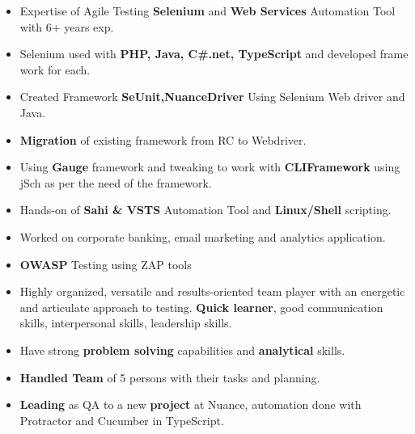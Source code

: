 

\begin{cvparagraph}

\begin{itemize}
 \item {Expertise of Agile Testing \textbf{Selenium} and \textbf{Web Services} Automation Tool with 6+ years exp.}

 \item {Selenium used with \textbf{PHP, Java, C\#.net, TypeScript} and developed frame work for each.}

 \item {Created Framework \textbf{SeUnit,NuanceDriver} Using Selenium Web driver and Java.}

 \item {\textbf{Migration} of existing framework from RC to Webdriver.}

 \item {Using \textbf{Gauge} framework and tweaking to work with \textbf{CLIFramework} using jSch as per the need of the framework.}

 \item {Hands-on of \textbf{Sahi \& VSTS} Automation Tool and \textbf{Linux/Shell} scripting.}

 \item {Worked on corporate banking, email marketing and analytics application.}

 \item {\textbf{OWASP} Testing using ZAP tools}

 \item {Highly organized, versatile and results-oriented team player with an energetic and articulate approach to testing. \textbf{Quick learner}, good communication skills, interpersonal skills, leadership skills.}

 \item {Have strong \textbf{problem solving} capabilities and \textbf{analytical} skills.}

 \item {\textbf{Handled Team} of 5 persons with their tasks and planning.}
 
 \item {\textbf{Leading} as QA to a new \textbf{project} at Nuance, automation done with Protractor and Cucumber in TypeScript.}
\end{itemize}
\end{cvparagraph}
